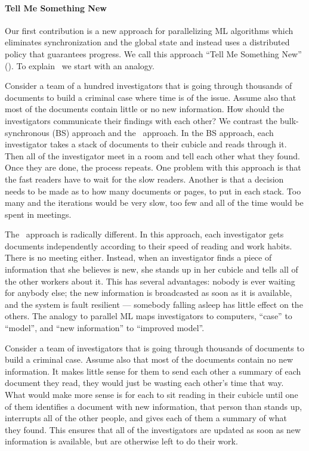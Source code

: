 \paragraph{Tell Me Something New}

Our first contribution is a new approach for parallelizing ML algorithms
which eliminates synchronization and the global state and instead uses a
distributed policy that guarantees progress. We call this approach
``Tell Me Something New'' (\tmsn). To explain \tmsn\ we start with an
analogy.

Consider a team of a hundred investigators that is going through
thousands of documents to build a criminal case where time is of the
issue. Assume also that most of the documents contain little or no new
information. How should the investigators communicate their findings
with each other? We contrast the bulk-synchronous (BS) approach and the
\tmsn\ approach. In the BS approach, each investigator takes a stack
of documents to their cubicle and reads through it. Then all of the
investigator meet in a room and tell each other what they found. Once
they are done, the process repeats. One problem with this approach is
that the fast readers have to wait for the slow readers. Another is
that a decision needs to be made as to how many documents or pages, to
put in each stack. Too many and the iterations would be very slow, too
few and all of the time would be spent in meetings.

The \tmsn\ approach is radically different. In this approach, each
investigator gets documents independently according to their speed of
reading and work habits. There is no meeting either. Instead, when
an investigator finds a piece of information that she believes is new,
she stands up in her cubicle and tells all of the other workers about
it. This has several advantages: nobody is ever waiting for anybody
else; the new information is broadcasted as soon as it is available, and
the system is fault resilient --- somebody falling asleep has little
effect on the others.
The analogy to parallel ML maps investigators
to computers, ``case'' to ``model'', and ``new information'' to
``improved model''.

Consider a team of investigators that is going through
thousands of documents to build a criminal case. Assume also that most
of the documents contain no new information. It makes little sense for
them to send each other a summary of each document they read, they
would just be wasting each other's time that way. What would make more
sense is for each to sit reading in their cubicle until one of them
identifies a document with new information, that person than stands
up, interrupts all of the other people, and gives each of them a
summary of what they found. This ensures that all of the investigators
are updated as soon as new information is available, but are otherwise
left to do their work.

